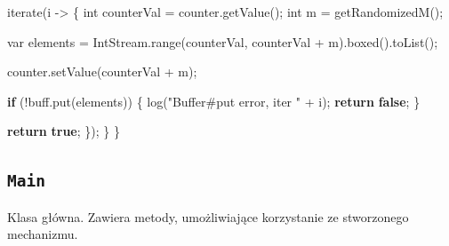 \documentclass[11pt]{article}
\newenvironment{Shaded}{}{}
\newcommand{\KeywordTok}[1]{\textcolor[rgb]{0.00,0.44,0.13}{\textbf{{#1}}}}
\newcommand{\DataTypeTok}[1]{\textcolor[rgb]{0.56,0.13,0.00}{{#1}}}
\newcommand{\StringTok}[1]{\textcolor[rgb]{0.25,0.44,0.63}{{#1}}}
\newcommand{\FunctionTok}[1]{\textcolor[rgb]{0.02,0.16,0.49}{{#1}}}
\newcommand{\NormalTok}[1]{{#1}}
\newcommand{\ControlFlowTok}[1]{\textcolor[rgb]{0.00,0.44,0.13}{\textbf{{#1}}}}
\newcommand{\OperatorTok}[1]{\textcolor[rgb]{0.40,0.40,0.40}{{#1}}}
\begin{document}
\begin{Shaded}
\begin{Highlighting}[]
        \FunctionTok{iterate}\OperatorTok{(}\NormalTok{i }\OperatorTok{{-}\textgreater{}} \OperatorTok{\{}
            \DataTypeTok{int}\NormalTok{ counterVal }\OperatorTok{=}\NormalTok{ counter}\OperatorTok{.}\FunctionTok{getValue}\OperatorTok{();}
            \DataTypeTok{int}\NormalTok{ m }\OperatorTok{=} \FunctionTok{getRandomizedM}\OperatorTok{();}

            \DataTypeTok{var}\NormalTok{ elements }\OperatorTok{=}\NormalTok{ IntStream}\OperatorTok{.}\FunctionTok{range}\OperatorTok{(}\NormalTok{counterVal}\OperatorTok{,}\NormalTok{ counterVal }\OperatorTok{+}\NormalTok{ m}\OperatorTok{).}\FunctionTok{boxed}\OperatorTok{().}\FunctionTok{toList}\OperatorTok{();}

\NormalTok{            counter}\OperatorTok{.}\FunctionTok{setValue}\OperatorTok{(}\NormalTok{counterVal }\OperatorTok{+}\NormalTok{ m}\OperatorTok{);}

            \ControlFlowTok{if} \OperatorTok{(!}\NormalTok{buff}\OperatorTok{.}\FunctionTok{put}\OperatorTok{(}\NormalTok{elements}\OperatorTok{))} \OperatorTok{\{}
                \FunctionTok{log}\OperatorTok{(}\StringTok{"Buffer\#put error, iter "} \OperatorTok{+}\NormalTok{ i}\OperatorTok{);}
                \ControlFlowTok{return} \KeywordTok{false}\OperatorTok{;}
            \OperatorTok{\}}

            \ControlFlowTok{return} \KeywordTok{true}\OperatorTok{;}
        \OperatorTok{\});}
    \OperatorTok{\}}
\OperatorTok{\}}
\end{Highlighting}
\end{Shaded}

    \hypertarget{main}{%
\subsection{\texorpdfstring{\texttt{Main}}{Main}}\label{main}}

Klasa główna. Zawiera metody, umożliwiające korzystanie ze stworzonego
mechanizmu.
\end{document}
